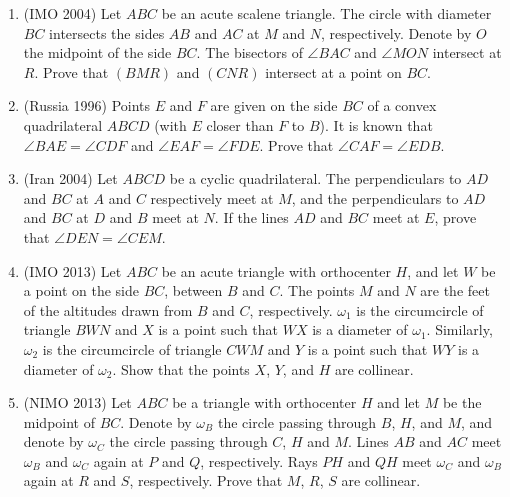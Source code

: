 \documentclass[11pt,paper=letter]{scrartcl}
\begin{document}
\begin{enumerate}
  \item (IMO 2004) Let $ABC$ be an acute scalene triangle. The circle with diameter $BC$ intersects the sides $AB$ and $AC$ at $M$ and $N$, respectively. Denote by $O$ the midpoint of the side $BC$. The bisectors of $\angle BAC$ and $\angle MON$ intersect at $R$. Prove that $(BMR)$ and $(CNR)$ intersect at a point on $BC$. %

  \item (Russia 1996) Points $E$ and $F$ are given on the side $BC$ of a convex quadrilateral $ABCD$ (with $E$ closer than $F$ to $B$). It is known that $\angle BAE = \angle CDF$ and $\angle EAF = \angle FDE$. Prove that $\angle CAF = \angle EDB$. %

  \item (Iran 2004) Let $ABCD$ be a cyclic quadrilateral. The perpendiculars to $AD$ and $BC$ at $A$ and $C$ respectively meet at $M$, and the perpendiculars to $AD$ and $BC$ at $D$ and $B$ meet at $N$. If the lines $AD$ and $BC$ meet at $E$, prove that $\angle DEN = \angle CEM$. %


  \item (IMO 2013) Let $ABC$ be an acute triangle with orthocenter $H$, and let $W$ be a point on the side $BC$, between $B$ and $C$. The points $M$ and $N$ are the feet of the altitudes drawn from $B$ and $C$, respectively. $\omega_1$ is the circumcircle of triangle $BWN$ and $X$ is a point such that $WX$ is a diameter of $\omega_1$. Similarly, $\omega_2$ is the circumcircle of triangle $CWM$ and $Y$ is a point such that $WY$ is a diameter of $\omega_2$. Show that the points $X$, $Y$, and $H$ are collinear. %

  \item (NIMO 2013) Let $ABC$ be a triangle with orthocenter $H$ and let $M$ be the midpoint of $BC$. Denote by $\omega_B$ the circle passing through $B$, $H$, and $M$, and denote by $\omega_C$ the circle passing through $C$, $H$ and $M$. Lines $AB$ and $AC$ meet $\omega_B$ and $\omega_C$ again at $P$ and $Q$, respectively. Rays $PH$ and $QH$ meet $\omega_C$ and $\omega_B$ again at $R$ and $S$, respectively. Prove that $M$, $R$, $S$ are collinear. %


\end{enumerate}
\end{document}

